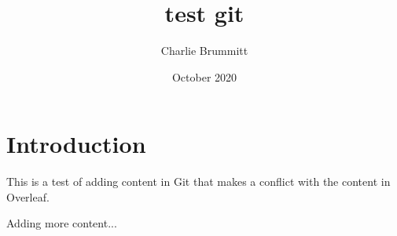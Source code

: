 \documentclass{article}
\title{test git}
\author{Charlie Brummitt}
\date{October 2020}
\begin{document}
\maketitle

\section{Introduction}
This is a test of adding content in Git that makes a conflict with the content in Overleaf.

Adding more content...
\end{document}
